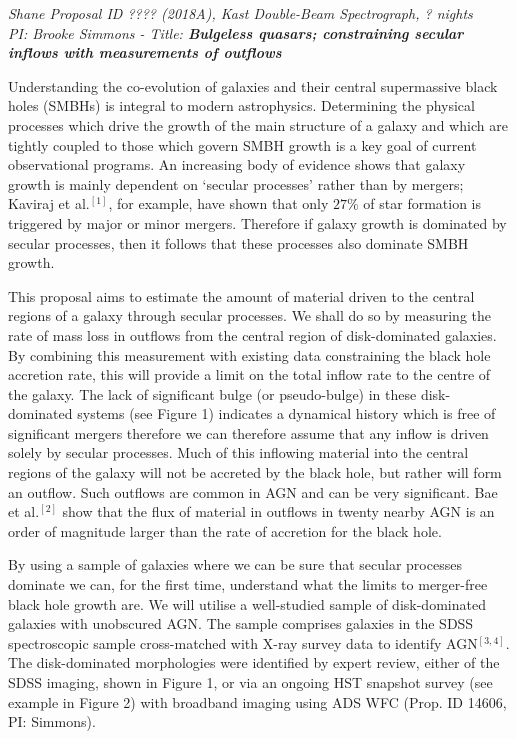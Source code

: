 \documentclass[12pt]{article}
\begin{document}
\noindent \emph{Shane Proposal ID ???? (2018A), Kast Double-Beam Spectrograph, ? nights} \\
\noindent \emph{PI: Brooke Simmons - Title: {\bf Bulgeless quasars; constraining secular inflows with measurements of outflows}} 
\vspace{0.5em}

\vspace{0.25em}

Understanding the co-evolution of galaxies and their central supermassive black holes (SMBHs) is integral to modern astrophysics. Determining the physical processes which drive the growth of the main structure of a galaxy and which are tightly coupled to those which govern SMBH growth is a key goal of current observational programs. An increasing body of evidence shows that galaxy growth is mainly dependent on `secular processes' rather than by mergers; Kaviraj et al.$^{[1]}$, for example, have shown that only $27\%$ of star formation is triggered by major or minor mergers. Therefore if galaxy growth is dominated by secular processes, then it follows that these processes also dominate SMBH growth.
\vspace{0.25em}

This proposal aims to estimate the amount of material driven to the central regions of a galaxy through secular processes. We shall do so by measuring the rate of mass loss in outflows from the central region of disk-dominated galaxies. By combining this measurement with existing data constraining the black hole accretion rate, this will provide a limit on the total inflow rate to the centre of the galaxy. The lack of significant bulge (or pseudo-bulge) in these disk-dominated systems (see Figure 1) indicates a dynamical history which is free of significant mergers therefore we can therefore assume that any inflow is driven solely by secular processes. Much of this inflowing material into the central regions of the galaxy will not be accreted by the black hole, but rather will form an outflow. Such outflows are common in AGN and can be very significant. Bae et al.$^{[2]}$ show that the flux of material in outflows in twenty nearby AGN is an order of magnitude larger than the rate of accretion for the black hole.
\vspace{0.25em}

By using a sample of galaxies where we can be sure that secular processes dominate we can, for the first time, understand what the limits to merger-free black hole growth are. We will utilise a well-studied sample of disk-dominated galaxies with unobscured AGN. The sample comprises galaxies in the SDSS spectroscopic sample cross-matched with X-ray survey data to identify AGN$^{[3,4]}$. The disk-dominated morphologies were identified by expert review, either of the SDSS imaging, shown in Figure 1, or via an ongoing HST snapshot survey (see example in Figure 2) with broadband imaging using ADS WFC (Prop. ID 14606, PI: Simmons). 
\vspace{0.25em}
\end{document}
